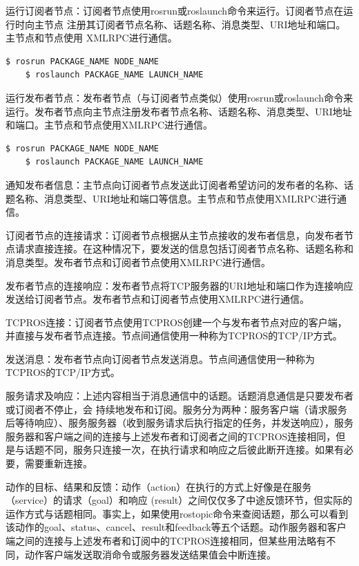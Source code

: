 \documentclass[geye,green,kindle,cn]{elegantnote}
\begin{document}
运行订阅者节点：订阅者节点使用rosrun或roslaunch命令来运行。订阅者节点在运行时向主节点 注册其订阅者节点名称、话题名称、消息类型、URI地址和端口。主节点和节点使用 XMLRPC进行通信。
\begin{lstlisting}[frame=single,language=bash]
    $ rosrun PACKAGE_NAME NODE_NAME
    $ roslaunch PACKAGE_NAME LAUNCH_NAME
\end{lstlisting}

运行发布者节点：发布者节点（与订阅者节点类似）使用rosrun或roslaunch命令来运行。发布者节点向主节点注册发布者节点名称、话题名称、消息类型、URI地址和端口。主节点和节点使用XMLRPC进行通信。
\begin{lstlisting}[frame=single,language=bash]
    $ rosrun PACKAGE_NAME NODE_NAME
    $ roslaunch PACKAGE_NAME LAUNCH_NAME
\end{lstlisting}

通知发布者信息：主节点向订阅者节点发送此订阅者希望访问的发布者的名称、话题名称、消息类型、URI地址和端口等信息。主节点和节点使用XMLRPC进行通信。

订阅者节点的连接请求：订阅者节点根据从主节点接收的发布者信息，向发布者节点请求直接连接。在这种情况下，要发送的信息包括订阅者节点名称、话题名称和消息类型。发布者节点和订阅者节点使用XMLRPC进行通信。

发布者节点的连接响应：发布者节点将TCP服务器的URI地址和端口作为连接响应发送给订阅者节点。发布者节点和订阅者节点使用XMLRPC进行通信。

TCPROS连接：订阅者节点使用TCPROS创建一个与发布者节点对应的客户端，并直接与发布者节点连接。节点间通信使用一种称为TCPROS的TCP/IP方式。

发送消息：发布者节点向订阅者节点发送消息。节点间通信使用一种称为TCPROS的TCP/IP方式。

服务请求及响应：上述内容相当于消息通信中的话题。话题消息通信是只要发布者或订阅者不停止，会 持续地发布和订阅。服务分为两种：服务客户端（请求服务后等待响应）、服务服务器（收到服务请求后执行指定的任务，并发送响应），服务服务器和客户端之间的连接与上述发布者和订阅者之间的TCPROS连接相同，但是与话题不同，服务只连接一次，在执行请求和响应之后彼此断开连接。如果有必要，需要重新连接。

动作的目标、结果和反馈：动作（action）在执行的方式上好像是在服务（service）的请求（goal）和响应 (result）之间仅仅多了中途反馈环节，但实际的运作方式与话题相同。事实上，如果使用rostopic命令来查阅话题，那么可以看到该动作的goal、status、cancel、result和feedback等五个话题。动作服务器和客户端之间的连接与上述发布者和订阅中的TCPROS连接相同，但某些用法略有不同，动作客户端发送取消命令或服务器发送结果值会中断连接。
\end{document}
